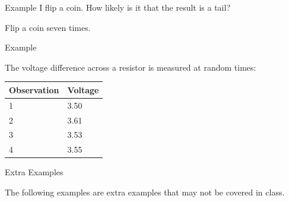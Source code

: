   

\begin{frame}{Example}
  I flip a coin. How likely is it that the result is a tail?

  \vfill

  Flip a coin seven times.

  \vfill

\end{frame}


\begin{frame}{Example}

  The voltage difference across a resistor is measured at random
  times: \\ [10pt]
  \begin{tabular}{l|l}
    Observation & Voltage \\ \hline
    1 & 3.50 \\
    2 & 3.61 \\
    3 & 3.53 \\
    4 & 3.55 
  \end{tabular}

  \vfill

  
\end{frame}

\begin{frame}{Extra Examples}

  \vfill

  The following examples are extra examples that may not be covered in
  class.

  \vfill
  
\end{frame}

